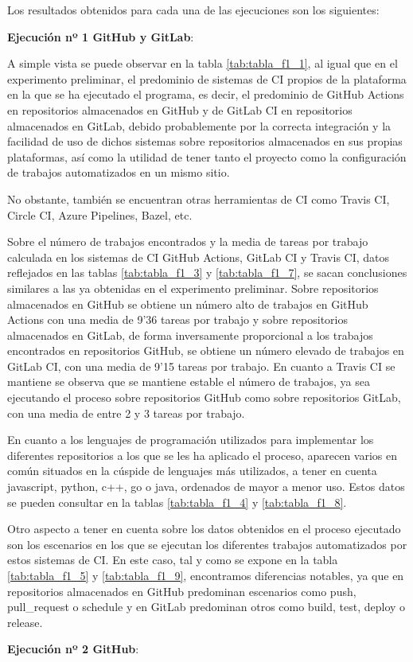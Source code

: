 Los resultados obtenidos para cada una de las ejecuciones son los siguientes:
\begin{compactitem}
    \item \textbf{Ejecución nº 1 GitHub y GitLab}: 
    
    A simple vista se puede observar en la tabla \ref{tab:tabla_f1_1}, al igual que en el experimento preliminar, el predominio de sistemas de CI propios de la plataforma en la que se ha ejecutado el programa, es decir, el predominio de GitHub Actions en repositorios almacenados en GitHub y de GitLab CI en repositorios almacenados en GitLab, debido probablemente por la correcta integración y la facilidad de uso de dichos sistemas sobre repositorios almacenados en sus propias plataformas, así como la utilidad de tener tanto el proyecto como la configuración de trabajos automatizados en un mismo sitio.

    No obstante, también se encuentran otras herramientas de CI como Travis CI, Circle CI, Azure Pipelines, Bazel, etc.

    Sobre el número de trabajos encontrados y la media de tareas por trabajo calculada en los sistemas de CI GitHub Actions, GitLab CI y Travis CI, datos reflejados en las tablas \ref{tab:tabla_f1_3} y \ref{tab:tabla_f1_7}, se sacan conclusiones similares a las ya obtenidas en el experimento preliminar. Sobre repositorios almacenados en GitHub se obtiene un número alto de trabajos en GitHub Actions con una media de 9'36 tareas por trabajo y sobre repositorios almacenados en GitLab, de forma inversamente proporcional a los trabajos encontrados en repositorios GitHub, se obtiene un número elevado de trabajos en GitLab CI, con una media de 9'15 tareas por trabajo. En cuanto a Travis CI se mantiene se observa que se mantiene estable el número de trabajos, ya sea ejecutando el proceso sobre repositorios GitHub como sobre repositorios GitLab, con una media de entre 2 y 3 tareas por trabajo.

    En cuanto a los lenguajes de programación utilizados para implementar los diferentes repositorios a los que se les ha aplicado el proceso, aparecen varios en común situados en la cúspide de lenguajes más utilizados, a tener en cuenta javascript, python, c++, go o java, ordenados de mayor a menor uso. Estos datos se pueden consultar en la tablas \ref{tab:tabla_f1_4} y \ref{tab:tabla_f1_8}.

    Otro aspecto a tener en cuenta sobre los datos obtenidos en el proceso ejecutado son los escenarios en los que se ejecutan los diferentes trabajos automatizados por estos sistemas de CI. En este caso, tal y como se expone en la tabla \ref{tab:tabla_f1_5} y \ref{tab:tabla_f1_9}, encontramos diferencias notables, ya que en repositorios almacenados en GitHub predominan escenarios como push, pull\_request o schedule y en GitLab predominan otros como build, test, deploy o release.
    \item \textbf{Ejecución nº 2 GitHub}:
    

\end{compactitem}
